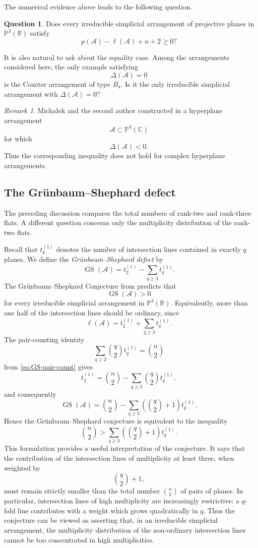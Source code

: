 \documentclass[11pt]{article}
\theoremstyle{definition}
\newtheorem{question}[theorem]{Question}
\theoremstyle{remark}
\newtheorem{remark}[theorem]{Remark}
\newcommand{\PP}{\mathbb P}
\newcommand{\RR}{\mathbb R}
\newcommand{\CC}{\mathbb C}
\newcommand{\cA}{\mathcal A}
\begin{document}
The numerical evidence above leads to the following question.

\begin{question}
\label{question:purdy-simplicial}
Does every irreducible simplicial arrangement of projective planes in
$\PP^3(\RR)$ satisfy
\[
p(\cA)-\ell(\cA)+n+2\geq0?
\]
\end{question}

It is also natural to ask about the equality case. Among the
arrangements considered here, the only example satisfying
\[
\Delta(\cA)=0
\]
is the Coxeter arrangement of type $B_4$. Is it the only irreducible simplicial arrangement with $\Delta(\cA)=0$?

\begin{remark}
Micha{\l}ek and the second author constructed in \cite{MMPP} a
hyperplane arrangement
\[
\cA\subset\PP^3(\CC)
\]
for which
\[
\Delta(\cA)<0.
\]
Thus the corresponding inequality does not hold for complex
hyperplane arrangements.
\end{remark}

\subsection{The Gr\"unbaum--Shephard defect}
\label{subsec:GS-defect}

The preceding discussion compares the total numbers of rank-two and
rank-three flats. A different question concerns only the multiplicity
distribution of the rank-two flats.

Recall that $t_q^{(1)}$ denotes the number of intersection lines contained
in exactly $q$ planes. We define the \emph{Gr\"unbaum--Shephard defect}
by
\[
\operatorname{GS}(\cA)
=
t_2^{(1)}-\sum_{q\geq3}t_q^{(1)}.
\]
The Gr\"unbaum--Shephard Conjecture from \cite{GrunbaumShephard} predicts that
\[
\operatorname{GS}(\cA)>0
\]
for every irreducible simplicial arrangement in $\PP^3(\RR)$. Equivalently,
more than one half of the intersection lines should be ordinary, since
\[
\ell(\cA)
=
t_2^{(1)}+\sum_{q\geq3}t_q^{(1)}.
\]
The pair-counting identity
\[
\sum_{q\geq2}\binom{q}{2}t_q^{(1)}
=
\binom{n}{2}
\]
from \eqref{eq:GS-pair-count} gives
\[
t_2^{(1)}
=
\binom{n}{2}
-
\sum_{q\geq3}\binom{q}{2}t_q^{(1)},
\]
and consequently
\begin{equation}
\label{eq:GS-defect}
\operatorname{GS}(\cA)
=
\binom{n}{2}
-
\sum_{q\geq3}
\left(
\binom{q}{2}+1
\right)t_q^{(1)}.
\end{equation}
Hence the Gr\"unbaum--Shephard conjecture is equivalent to the inequality
\[
\binom{n}{2}
>
\sum_{q\geq3}
\left(
\binom{q}{2}+1
\right)t_q^{(1)}.
\]
This formulation provides a useful interpretation of the conjecture.
It says that the contribution of the intersection lines of multiplicity at
least three, when weighted by
\[
\binom{q}{2}+1,
\]
must remain strictly smaller than the total number $\binom{n}{2}$ of
pairs of planes. In particular, intersection lines of high multiplicity
are increasingly restrictive: a $q$-fold line contributes with a weight
which grows quadratically in $q$. Thus the conjecture can be viewed as
asserting that, in an irreducible simplicial arrangement, the
multiplicity distribution of the non-ordinary intersection lines cannot
be too concentrated in high multiplicities.
\end{document}
